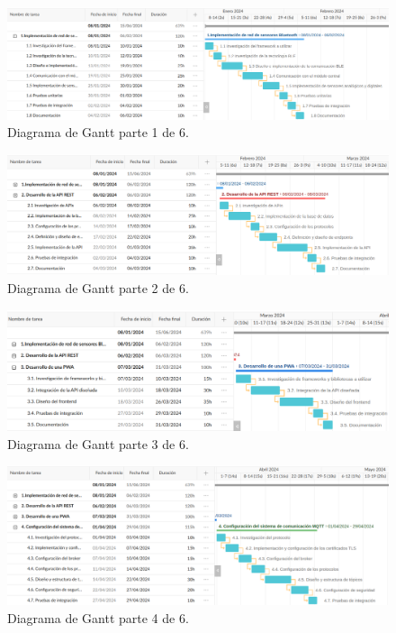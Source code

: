 \documentclass[
11pt, %
]{charter}
\begin{document}
\begin{figure}[htpb]
\centering 
\includegraphics[width=1.1\textwidth]{./Figuras/diagrama_gantt_1.png}
\caption{Diagrama de Gantt parte 1 de 6.}
\label{fig:diagGrantt1}
\end{figure}
\vspace{5px}

\begin{figure}[htpb]
\centering 
\includegraphics[width=1.1\textwidth]{./Figuras/diagrama_gantt_2.png}
\caption{Diagrama de Gantt parte 2 de 6.}
\label{fig:diagGrantt2}
\end{figure}
\vspace{5px}

\begin{figure}[htpb]
\centering 
\includegraphics[width=1.1\textwidth]{./Figuras/diagrama_gantt_3.png}
\caption{Diagrama de Gantt parte 3 de 6.}
\label{fig:diagGrantt3}
\end{figure}
\vspace{5px}

\begin{figure}[htpb]
\centering 
\includegraphics[width=1.1\textwidth]{./Figuras/diagrama_gantt_4.png}
\caption{Diagrama de Gantt parte 4 de 6.}
\label{fig:diagGrantt4}
\end{figure}
\vspace{5px}
\end{document}
